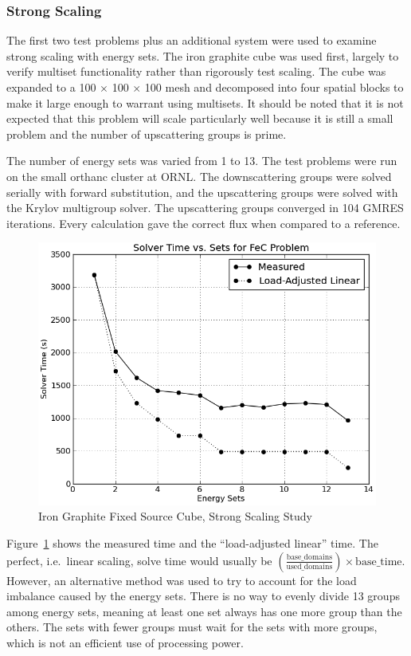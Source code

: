 \subsubsection{Strong Scaling}
The first two test problems plus an additional system were used to examine strong scaling with energy sets. The iron graphite cube was used first, largely to verify multiset functionality rather than rigorously test scaling. The cube was expanded to a 100 $\times$ 100 $\times$ 100 mesh and decomposed into four spatial blocks to make it large enough to warrant using multisets. It should be noted that it is not expected that this problem will scale particularly well because it is still a small problem and the number of upscattering groups is prime. 

The number of energy sets was varied from 1 to 13. The test problems were run on the small orthanc cluster at ORNL. The downscattering groups were solved serially with forward substitution, and the upscattering groups were solved with the Krylov multigroup solver. The upscattering groups converged in 104 GMRES iterations. Every calculation gave the correct flux when compared to a reference.

\begin{figure}[!h]
  \begin{center}
    \includegraphics [width=.75\textwidth, height=0.45\textheight ] {FeCKrylovMultisets}
  \end{center}
  \caption{Iron Graphite Fixed Source Cube, Strong Scaling Study}
  \label{fig:FeGraphiteStudy}
\end{figure}
%
Figure~\ref{fig:FeGraphiteStudy} shows the measured time and the ``load-adjusted linear'' time. The perfect, i.e.\ linear scaling, solve time would usually be $(\frac{\text{base\_domains}}{\text{used\_domains}}) \times \text{base\_time}$. However, an alternative method was used to try to account for the load imbalance caused by the energy sets. There is no way to evenly divide 13 groups among energy sets, meaning at least one set always has one more group than the others. The sets with fewer groups must wait for the sets with more groups, which is not an efficient use of processing power. 

